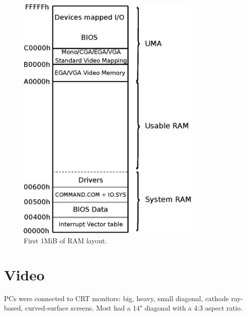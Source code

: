 \documentclass[book.tex]{subfiles}
\begin{document}
\par
\begin{figure}[H]
\centering
\includegraphics[width=0.8\textwidth]{imgs/drawings/real_mode_v2.eps}
\caption{First 1MiB of RAM layout.}
\label{fig:fp_internals}
\end{figure}
\pagebreak




\section{Video}

PCs were connected to CRT monitors: big, heavy, small diagonal, cathode ray-based, curved-surface screens. Most had a 14" diagonal with a 4:3 aspect ratio.\\
\par
\end{document}
